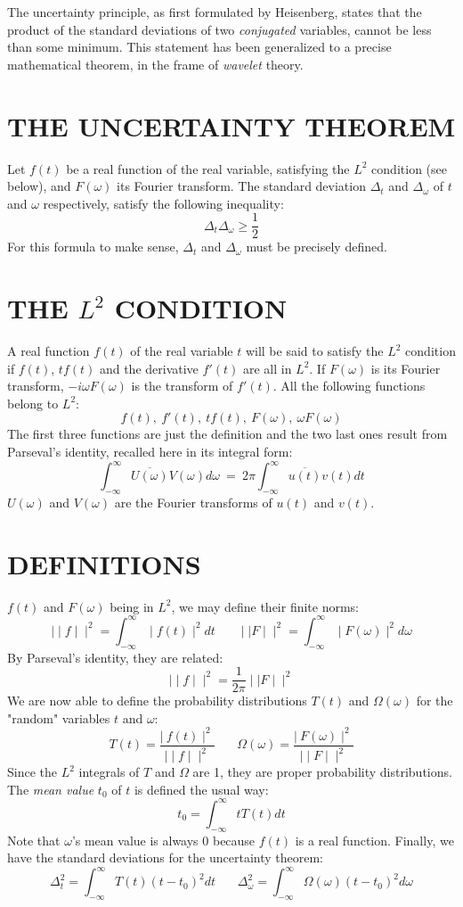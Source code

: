 \documentclass[12pt]{article}
\begin{document}
The uncertainty principle, as first formulated by Heisenberg, states that the product of the standard deviations of two {\it conjugated} variables, cannot be less than some minimum. This statement has been generalized to a precise mathematical theorem, in the frame of {\it wavelet} theory.

\section{THE UNCERTAINTY THEOREM}

	Let $f(t)$ be a real function of the real variable, satisfying the $L^2$ condition (see below), and $F(\omega)$ its Fourier transform. The standard deviation $\Delta_t$ and $\Delta_\omega$ of $t$ and $\omega$ respectively, satisfy the following inequality:
$$\Delta_t\Delta_\omega\geq\frac{1}{2}$$
For this formula to make sense, $\Delta_t$ and $\Delta_\omega$ must be precisely defined. 

\section{THE {\boldmath$L^2$} CONDITION}

	A real function $f(t)$ of the real variable $t$ will be said to satisfy the 
$L^2$ condition if $f(t)$, $tf(t)$ and the derivative $f'(t)$ are all in $L^2$. \newline
 If $F(\omega)$ is its Fourier transform, $-i\omega F(\omega)$ is the transform of $f'(t)$. All the following functions belong to $L^2$:
$$f(t),~f'(t),~tf(t),~F(\omega),~\omega F(\omega)$$
The first three functions are just the definition and the two last ones result from Parseval's identity, recalled here in its integral form:
$$\int_{-\infty}^{\infty} \overline{U(\omega)}V(\omega) d\omega~=~2\pi\int_{-\infty}^{\infty} \overline{u(t)}v(t) dt$$
$U(\omega)$ and $V(\omega)$ are the Fourier transforms of $u(t)$ and $v(t)$.

\section{DEFINITIONS}

$f(t)$ and $F(\omega)$ being in $L^2$, we may define their finite norms:
$$ \mid\mid f \mid\mid ^2  = \int_{-\infty}^{\infty} \mid f(t) \mid ^2 dt ~~~~~~~~ \mid\mid F \mid\mid ^2  = \int_{-\infty}^{\infty} \mid F(\omega) \mid ^2 d\omega $$
By Parseval's identity, they are related:
$$ \mid\mid f \mid\mid ^2  = \frac{1}{2\pi} \mid\mid F \mid\mid ^2$$
We are now able to define the probability distributions $T(t)$ and $\Omega(\omega)$ for the "random" variables $t$ and $\omega$:
$$ T(t) = \frac{\mid\ f(t) \mid ^2}{\mid\mid f \mid\mid ^2} ~~~~~~~~
\Omega(\omega) = \frac{\mid\ F(\omega) \mid ^2}{\mid\mid F \mid\mid ^2}$$
Since the $L^2$ integrals of $T$ and $\Omega$ are 1, they are proper probability distributions. The {\it mean value} $t_0$ of $t$ is defined the usual way:
$$t_0 = \int_{-\infty}^{\infty}tT(t)dt$$
Note that $\omega$'s mean value is always 0 because $f(t)$ is a real function.
Finally, we have the standard deviations for the uncertainty theorem:
$$\Delta_t^2 = \int_{-\infty}^\infty T(t)(t-t_0)^2dt ~~~~~~~~
\Delta_{\omega}^2 = \int_{-\infty}^\infty \Omega(\omega)(t-t_0)^2d\omega$$
\end{document}
